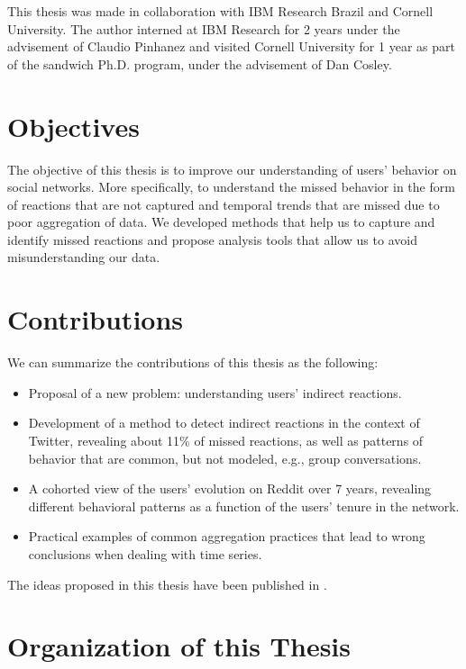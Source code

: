 This thesis was made in collaboration with IBM Research Brazil and Cornell University. The author interned at IBM Research for 2 years under the advisement of Claudio Pinhanez and visited Cornell University for 1 year as part of the sandwich Ph.D. program, under the advisement of Dan Cosley.

\section{Objectives}

The objective of this thesis is to improve our understanding of users' behavior on social networks. More specifically, to understand the missed behavior in the form of reactions that are not captured and temporal trends that are missed due to poor aggregation of data. We developed methods that help us to capture and identify missed reactions and propose analysis tools that allow us to avoid misunderstanding our data.

\section{Contributions}

We can summarize the contributions of this thesis as the following:

\begin{itemize}
	\item Proposal of a new problem: understanding users' indirect reactions.
	\item Development of a method to detect indirect reactions in the context of Twitter, revealing about 11\% of missed reactions, as well as patterns of behavior that are common, but not modeled, e.g., group conversations.
	\item A cohorted view of the users' evolution on Reddit over 7 years, revealing different behavioral patterns as a function of the users' tenure in the network.
	\item Practical examples of common aggregation practices that lead to wrong conclusions when dealing with time series.
\end{itemize}

The ideas proposed in this thesis have been published in \cite{BarbosaNeto2013, Barbosa, Barbosa2016}.

\section{Organization of this Thesis}

